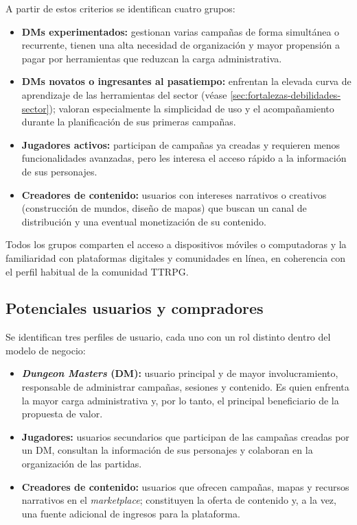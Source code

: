 A partir de estos criterios se identifican cuatro grupos:
\begin{itemize}
  \item \textbf{DMs experimentados:} gestionan varias campañas de forma simultánea o recurrente, tienen una alta necesidad de organización y mayor propensión a pagar por herramientas que reduzcan la carga administrativa.
  \item \textbf{DMs novatos o ingresantes al pasatiempo:} enfrentan la elevada curva de aprendizaje de las herramientas del sector (véase \ref{sec:fortalezas-debilidades-sector}); valoran especialmente la simplicidad de uso y el acompañamiento durante la planificación de sus primeras campañas.
  \item \textbf{Jugadores activos:} participan de campañas ya creadas y requieren menos funcionalidades avanzadas, pero les interesa el acceso rápido a la información de sus personajes.
  \item \textbf{Creadores de contenido:} usuarios con intereses narrativos o creativos (construcción de mundos, diseño de mapas) que buscan un canal de distribución y una eventual monetización de su contenido.
\end{itemize}

Todos los grupos comparten el acceso a dispositivos móviles o computadoras y la familiaridad con plataformas digitales y comunidades en línea, en coherencia con el perfil habitual de la comunidad TTRPG.

\subsection{Potenciales usuarios y compradores}
Se identifican tres perfiles de usuario, cada uno con un rol distinto dentro del modelo de negocio:
\begin{itemize}
  \item \textbf{\textit{Dungeon Masters} (DM):} usuario principal y de mayor involucramiento, responsable de administrar campañas, sesiones y contenido. Es quien enfrenta la mayor carga administrativa y, por lo tanto, el principal beneficiario de la propuesta de valor.
  \item \textbf{Jugadores:} usuarios secundarios que participan de las campañas creadas por un DM, consultan la información de sus personajes y colaboran en la organización de las partidas.
  \item \textbf{Creadores de contenido:} usuarios que ofrecen campañas, mapas y recursos narrativos en el \textit{marketplace}; constituyen la oferta de contenido y, a la vez, una fuente adicional de ingresos para la plataforma.
\end{itemize}

